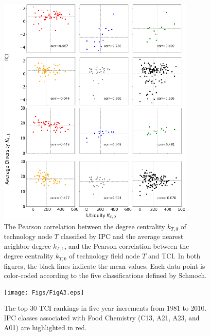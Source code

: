 \documentclass[fleqn,10pt]{wlscirep}
\begin{document}
\begin{figure}[ht]
    \centering
    \includegraphics[scale=2.50]{Figs/FigA2.eps}
    \caption{The Pearson correlation between the degree centrality \( k_{T,0} \) of technology node \( T \) classified by IPC and the average nearest neighbor degree \( k_{T,1} \), and the Pearson correlation between the degree centrality \( k_{T,0} \) of technology field node \( T \) and TCI. In both figures, the black lines indicate the mean values. Each data point is color-coded according to the five classifications defined by Schmoch\cite{Schmoch2008}.}
    \label{fig:persector}
\end{figure}

\begin{figure}[ht]
    \centering
    \texttt{[image: Figs/FigA3.eps]}
    \caption{The top 30 TCI rankings in five year increments from 1981 to 2010. IPC classes associated with Food Chemistry (C13, A21, A23, and A01) are highlighted in red.}
    \label{fig:bump}
\end{figure}
\end{document}

